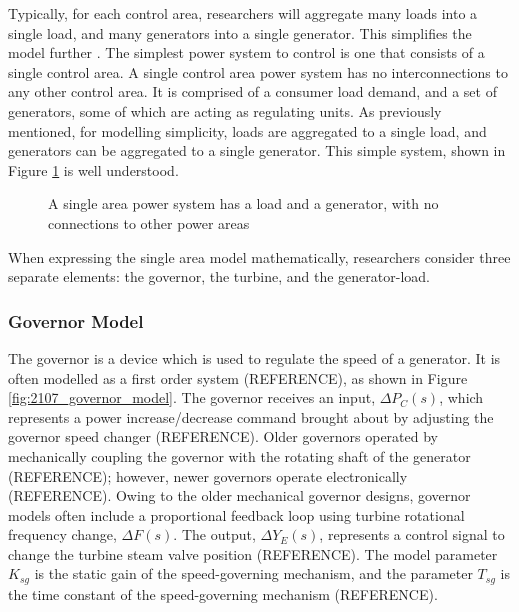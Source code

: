 Typically, for each control area, researchers will aggregate many loads into a single load, and many generators into a single generator. This simplifies the model further \cite{Grainger1994}. The simplest power system to control is one that consists of a single control area. A single control area power system has no interconnections to any other control area. It is comprised of a consumer load demand, and a set of generators, some of which are acting as regulating units. As previously mentioned, for modelling simplicity, loads are aggregated to a single load, and generators can be aggregated to a single generator. This simple system, shown in Figure \ref{fig:2106_single_area_system_overview} is well understood.

\begin{figure}[h]
	\centering
	\resizebox{4.5cm}{!}{}
	\caption[Single area power system]{A single area power system has a load and a generator, with no connections to other power areas}
	\label{fig:2106_single_area_system_overview}
\end{figure}

When expressing the single area model mathematically, researchers consider three separate elements: the governor, the turbine, and the generator-load.

\subsubsection{Governor Model}
The governor is a device which is used to regulate the speed of a generator. It is often modelled as a first order system (REFERENCE), as shown in Figure \ref{fig:2107_governor_model}. The governor receives an input, $\Delta P_C(s)$, which represents a power increase/decrease command brought about by adjusting the governor speed changer (REFERENCE). Older governors operated by mechanically coupling the governor with the rotating shaft of the generator (REFERENCE); however, newer governors operate electronically (REFERENCE). Owing to the older mechanical governor designs, governor models often include a proportional feedback loop using turbine rotational frequency change, $\Delta F(s)$. The output, $\Delta Y_E(s)$, represents a control signal to change the turbine steam valve position (REFERENCE). The model parameter $K_{sg}$ is the static gain of the speed-governing mechanism, and the parameter $T_{sg}$ is the time constant of the speed-governing mechanism (REFERENCE).

